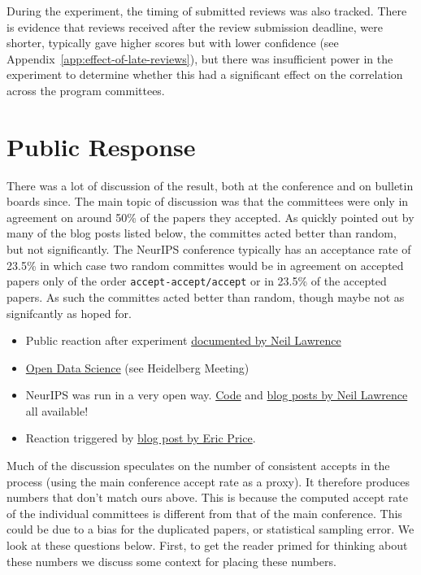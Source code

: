 \documentclass[twoside]{article}
\begin{document}
During the experiment, the timing of submitted reviews was also
tracked. There is evidence that reviews received after the review submission
deadline, were shorter, typically gave higher scores but with lower
confidence (see Appendix~\ref{app:effect-of-late-reviews}), but there
was insufficient power in the experiment to determine whether this had
a significant effect on the correlation across the program committees.

\section{Public Response}
There was a lot of discussion of the result, both at the
conference and on bulletin boards since. The main topic of discussion
was that the committees were only in agreement on around 50\% of the papers
they accepted. As quickly pointed out by many of the blog posts listed
below, the committes acted better than random, but not
significantly. The NeurIPS conference typically has an acceptance rate
of 23.5\% in which case two random committes would be in agreement on
accepted papers only of the order {\tt accept-accept/accept} or in
23.5\% of the accepted papers. As such the committes acted better than
random, though maybe not as signifcantly as hoped for.

\begin{itemize}
\item
  Public reaction after experiment
  \href{http://inverseprobability.com/2015/01/16/blogs-on-the-NeurIPS-experiment/}{documented
  by Neil Lawrence}
\item
  \href{http://inverseprobability.com/2014/07/01/open-data-science/}{Open
  Data Science} (see Heidelberg Meeting)
\item
  NeurIPS was run in a very open way.
  \href{https://github.com/sods/conference}{Code} and
  \href{http://inverseprobability.com/2014/12/16/the-NeurIPS-experiment/}{blog
  posts by Neil Lawrence} all available!
\item
  Reaction triggered by
  \href{http://blog.mrtz.org/2014/12/15/the-NeurIPS-experiment.html}{blog
  post by Eric Price}.
\end{itemize}

Much of the discussion speculates on the number of consistent accepts in
the process (using the main conference accept rate as a proxy). It
therefore produces numbers that don't match ours above. This is because
the computed accept rate of the individual committees is different from
that of the main conference. This could be due to a bias for the
duplicated papers, or statistical sampling error. We look at these
questions below. First, to get the reader primed for thinking about
these numbers we discuss some context for placing these numbers.
\end{document}

